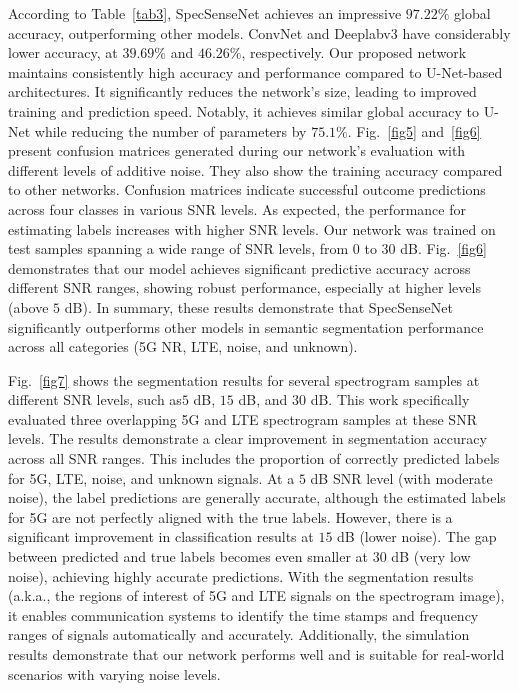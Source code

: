 \documentclass[journal]{IEEEtran} %
\begin{document}
According to Table~\ref{tab3}, SpecSenseNet achieves an impressive $97.22\%$ global accuracy, outperforming other models. ConvNet and Deeplabv3 have considerably lower accuracy, at $39.69\%$ and $46.26\%$, respectively. Our proposed network maintains consistently high accuracy and performance compared to U-Net-based architectures. It significantly reduces the network's size, leading to improved training and prediction speed. Notably, it achieves similar global accuracy to U-Net while reducing the number of parameters by $75.1\%$. Fig.~\ref{fig5} and~\ref{fig6} present confusion matrices generated during our network's evaluation with different levels of additive noise. They also show the training accuracy compared to other networks. Confusion matrices indicate successful outcome predictions across four classes in various SNR levels. As expected, the performance for estimating labels increases with higher SNR levels. Our network was trained on test samples spanning a wide range of SNR levels, from $0$ to $30$ dB. Fig.~\ref{fig6} demonstrates that our model achieves significant predictive accuracy across different SNR ranges, showing robust performance, especially at higher levels (above $5$ dB). In summary, these results demonstrate that SpecSenseNet significantly outperforms other models in semantic segmentation performance across all categories (5G NR, LTE, noise, and unknown).

Fig.~\ref{fig7} shows the segmentation results for several spectrogram samples at different SNR levels, such as$5$ dB, $15$ dB, and $30$ dB. This work specifically evaluated three overlapping 5G and LTE spectrogram samples at these SNR levels. The results demonstrate a clear improvement in segmentation accuracy across all SNR ranges. This includes the proportion of correctly predicted labels for 5G, LTE, noise, and unknown signals. At a $5$ dB SNR level (with moderate noise), the label predictions are generally accurate, although the estimated labels for 5G are not perfectly aligned with the true labels. However, there is a significant improvement in classification results at $15$ dB (lower noise). The gap between predicted and true labels becomes even smaller at $30$ dB (very low noise), achieving highly accurate predictions. With the segmentation results (a.k.a., the regions of interest of 5G and LTE signals on the spectrogram image), it enables communication systems to identify the time stamps and frequency ranges of signals automatically and accurately.
Additionally, the simulation results demonstrate that our network performs well and is suitable for real-world scenarios with varying noise levels.
\end{document}
